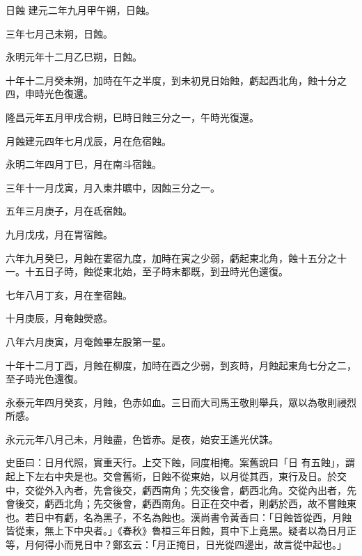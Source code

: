 \begin{pinyinscope}
 日蝕
 建元二年九月甲午朔，日蝕。



 三年七月己未朔，日蝕。



 永明元年十二月乙巳朔，日蝕。



 十年十二月癸未朔，加時在午之半度，到未初見日始蝕，虧起西北角，蝕十分之四，申時光色復還。



 隆昌元年五月甲戌合朔，巳時日蝕三分之一，午時光復還。



 月蝕建元四年七月戊辰，月在危宿蝕。



 永明二年四月丁巳，月在南斗宿蝕。



 三年十一月戊寅，月入東井曠中，因蝕三分之一。



 五年三月庚子，月在氐宿蝕。



 九月戊戌，月在胃宿蝕。



 六年九月癸巳，月蝕在婁宿九度，加時在寅之少弱，虧起東北角，蝕十五分之十一。十五日子時，蝕從東北始，至子時末都既，到丑時光色還復。



 七年八月丁亥，月在奎宿蝕。



 十月庚辰，月奄蝕熒惑。



 八年六月庚寅，月奄蝕畢左股第一星。



 十年十二月丁酉，月蝕在柳度，加時在酉之少弱，到亥時，月蝕起東角七分之二，至子時光色還復。



 永泰元年四月癸亥，月蝕，色赤如血。三日而大司馬王敬則舉兵，眾以為敬則祲烈所感。



 永元元年八月己未，月蝕盡，色皆赤。是夜，始安王遙光伏誅。



 史臣曰：日月代照，實重天行。上交下蝕，同度相掩。案舊說曰「日
 有五蝕」，謂起上下左右中央是也。交會舊術，日蝕不從東始，以月從其西，東行及日。於交中，交從外入內者，先會後交，虧西南角；先交後會，虧西北角。交從內出者，先會後交，虧西北角；先交後會，虧西南角。日正在交中者，則虧於西，故不嘗蝕東也。若日中有虧，名為黑子，不名為蝕也。漢尚書令黃香曰：「日蝕皆從西，月蝕皆從東，無上下中央者。」《春秋》魯桓三年日蝕，貫中下上竟黑。疑者以為日月正等，月何得小而見日中？鄭玄云：「月正掩日，日光從四邊出，故言從中起也。」




\end{pinyinscope}

